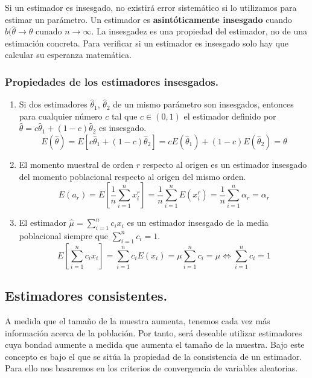 Si un estimador es insesgado, no existir\'a error sistem\'atico si lo utilizamos para estimar un par\'ametro. Un estimador es \textbf{asint\'oticamente insesgado} cuando $b(\hat{\theta}\to\theta$ cunado $n\to\infty$. La insesgadez es una propiedad del estimador, no de una estimaci\'on concreta. Para verificar si un estimador es insesgado solo hay que calcular su esperanza matem\'atica.
\subsubsection{Propiedades de los estimadores insesgados.}

\begin{enumerate}
\item Si dos estimadores $\hat{\theta}_1$, $\hat{\theta}_2$ de un mismo par\'ametro son insesgados, entonces para cualquier n\'umero $c$ tal que $c\in(0,1)$ el estimador definido por $\hat{\theta}=c\hat{\theta}_1+(1-c)\hat{\theta}_2$ es insesgado.
\begin{equation*}
E(\hat{\theta})=E\left[c\hat{\theta}_1+(1-c)\hat{\theta}_2\right]=cE(\hat{\theta}_1)+(1-c)E(\hat{\theta}_2)=\theta
\end{equation*}

\item El momento muestral de orden $r$ respecto al origen es un estimador insesgado del momento poblacional respecto al origen del mismo orden.
\begin{equation*}
E(a_r)=E\left[\frac{1}{n}\sum_{i=1}^nx_i^r\right]=\frac{1}{n}\sum_{i=1}^nE(x_i^r)=\frac{1}{n}\sum_{i=1}^n\alpha_r=\alpha_r
\end{equation*}

\item El estimador $\hat{\mu}=\sum_{i=1}^nc_ix_i$ es un estimador insesgado de la media poblacional siempre que $\sum_{i=1}^nc_i=1$.
\begin{equation*}
E\left[\sum_{i=1}^nc_ix_i\right]=\sum_{i=1}^nc_iE(x_i)=\mu\sum_{i=1}^nc_i=\mu \Leftrightarrow \sum_{i=1}^nc_i=1
\end{equation*}

\end{enumerate}

\subsection{Estimadores consistentes.}

A medida que el tama\~no de la muestra aumenta, tenemos cada vez m\'as informaci\'on acerca de la poblaci\'on. Por tanto, ser\'a deseable utilizar estimadores cuya bondad aumente a medida que aumenta el tama\~no de la muestra. Bajo este concepto es bajo el que se sit\'ua la propiedad de la consistencia de un estimador. Para ello nos basaremos en los criterios de convergencia de variables aleatorias.

